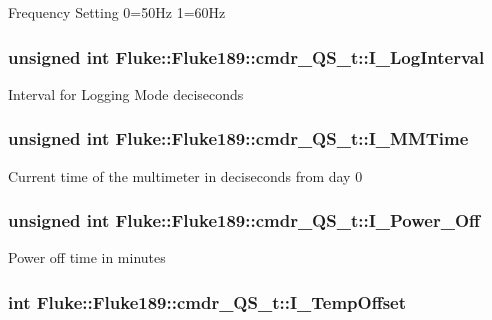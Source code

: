 \label{structFluke_1_1Fluke189_1_1cmdr__QS__t_abe993a772a9e7e60e8544d3a3eab3285}
Frequency Setting 0=50Hz 1=60Hz \hypertarget{structFluke_1_1Fluke189_1_1cmdr__QS__t_ae0893bb5a4c488e9d2acf79f87dba272}{
\subsubsection[{I\_\-LogInterval}]{\setlength{\rightskip}{0pt plus 5cm}unsigned int {\bf Fluke::Fluke189::cmdr\_\-QS\_\-t::I\_\-LogInterval}}}
\label{structFluke_1_1Fluke189_1_1cmdr__QS__t_ae0893bb5a4c488e9d2acf79f87dba272}
Interval for Logging Mode deciseconds \hypertarget{structFluke_1_1Fluke189_1_1cmdr__QS__t_aa9bdf12e3d59fe96b131f0decc669807}{
\subsubsection[{I\_\-MMTime}]{\setlength{\rightskip}{0pt plus 5cm}unsigned int {\bf Fluke::Fluke189::cmdr\_\-QS\_\-t::I\_\-MMTime}}}
\label{structFluke_1_1Fluke189_1_1cmdr__QS__t_aa9bdf12e3d59fe96b131f0decc669807}
Current time of the multimeter in deciseconds from day 0 \hypertarget{structFluke_1_1Fluke189_1_1cmdr__QS__t_a34b393258b0e2eda8c2eedde9bbe1ef6}{
\subsubsection[{I\_\-Power\_\-Off}]{\setlength{\rightskip}{0pt plus 5cm}unsigned int {\bf Fluke::Fluke189::cmdr\_\-QS\_\-t::I\_\-Power\_\-Off}}}
\label{structFluke_1_1Fluke189_1_1cmdr__QS__t_a34b393258b0e2eda8c2eedde9bbe1ef6}
Power off time in minutes \hypertarget{structFluke_1_1Fluke189_1_1cmdr__QS__t_a3ae4f44738b591f2dc068793861f2ea3}{
\subsubsection[{I\_\-TempOffset}]{\setlength{\rightskip}{0pt plus 5cm}int {\bf Fluke::Fluke189::cmdr\_\-QS\_\-t::I\_\-TempOffset}}}
